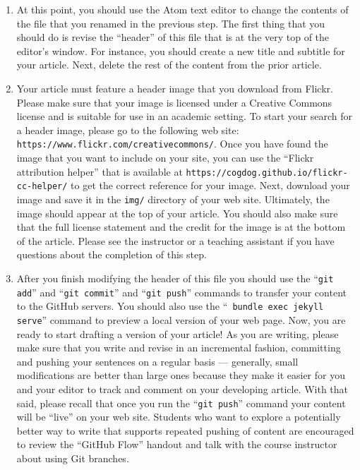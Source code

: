 \begin{enumerate}
  \item At this point, you should use the Atom text editor to change the contents of the file that you renamed in the
    previous step. The first thing that you should do is revise the ``header'' of this file that is at the very top of
    the editor's window. For instance, you should create a new title and subtitle for your article. Next, delete the
    rest of the content from the prior article.

  \item Your article must feature a header image that you download from Flickr. Please make sure that your image is
    licensed under a Creative Commons license and is suitable for use in an academic setting. To start your search for a
    header image, please go to the following web site: {\tt https://www.flickr.com/creativecommons/}. Once you have
    found the image that you want to include on your site, you can use the ``Flickr attribution helper'' that is
    available at {\tt https://cogdog.github.io/flickr-cc-helper/} to get the correct reference for your image. Next,
    download your image and save it in the {\tt img/} directory of your web site. Ultimately, the image should appear at
    the top of your article. You should also make sure that the full license statement and the credit for the image is
    at the bottom of the article. Please see the instructor or a teaching assistant if you have questions about the
    completion of this step.

  \item After you finish modifying the header of this file you should use the ``{\tt git add}'' and ``{\tt git commit}''
    and ``{\tt git push}'' commands to transfer your content to the GitHub servers. You should also use the ``{\tt
    bundle exec jekyll serve}'' command to preview a local version of your web page. Now, you are ready to start
    drafting a version of your article! As you are writing, please make sure that you write and revise in an incremental
    fashion, committing and pushing your sentences on a regular basis --- generally, small modifications are better than
    large ones because they make it easier for you and your editor to track and comment on your developing article. With
    that said, please recall that once you run the ``{\tt git push}'' command your content will be ``live'' on your web
    site. Students who want to explore a potentially better way to write that supports repeated pushing of content are
    encouraged to review the ``GitHub Flow'' handout and talk with the course instructor about using Git branches.


\end{enumerate}
